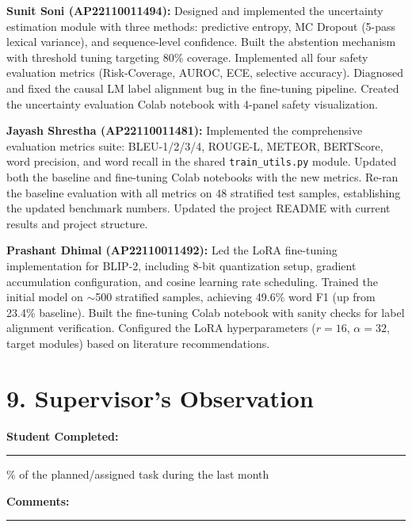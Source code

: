\documentclass[12pt,a4paper]{article}
\begin{document}
\noindent\textbf{Sunit Soni (AP22110011494):}
Designed and implemented the uncertainty estimation module with three methods: predictive entropy, MC Dropout (5-pass lexical variance), and sequence-level confidence. Built the abstention mechanism with threshold tuning targeting 80\% coverage. Implemented all four safety evaluation metrics (Risk-Coverage, AUROC, ECE, selective accuracy). Diagnosed and fixed the causal LM label alignment bug in the fine-tuning pipeline. Created the uncertainty evaluation Colab notebook with 4-panel safety visualization.

\vspace{0.4cm}

\noindent\textbf{Jayash Shrestha (AP22110011481):}
Implemented the comprehensive evaluation metrics suite: BLEU-1/2/3/4, ROUGE-L, METEOR, BERTScore, word precision, and word recall in the shared \texttt{train\_utils.py} module. Updated both the baseline and fine-tuning Colab notebooks with the new metrics. Re-ran the baseline evaluation with all metrics on 48 stratified test samples, establishing the updated benchmark numbers. Updated the project README with current results and project structure.

\vspace{0.4cm}

\noindent\textbf{Prashant Dhimal (AP22110011492):}
Led the LoRA fine-tuning implementation for BLIP-2, including 8-bit quantization setup, gradient accumulation configuration, and cosine learning rate scheduling. Trained the initial model on $\sim$500 stratified samples, achieving 49.6\% word F1 (up from 23.4\% baseline). Built the fine-tuning Colab notebook with sanity checks for label alignment verification. Configured the LoRA hyperparameters ($r=16$, $\alpha=32$, target modules) based on literature recommendations.

\section*{9. Supervisor's Observation}

\noindent\textbf{Student Completed:} \rule{3cm}{0.4pt}\% 
of the planned/assigned task during the last month

\vspace{0.5cm}

\noindent\textbf{Comments:}

\vspace{1cm}
\noindent\rule{\textwidth}{0.4pt}

\vspace{0.5cm}
\end{document}
